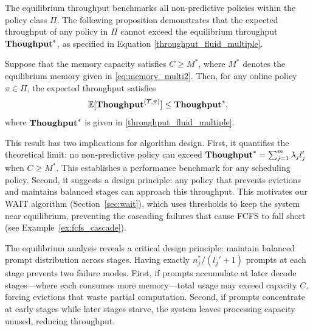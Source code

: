 The equilibrium throughput benchmarks all non-predictive policies within the policy class \(\Pi\). The following proposition demonstrates that the expected throughput of any policy in \(\Pi\) cannot exceed the equilibrium throughput \(\textbf{Thoughput}^*\), as specified in Equation \eqref{throughput_fluid_multiple}. 

\begin{proposition}\label{prop::online policy expected throughput upper bound, multiple type}
Suppose that the memory capacity satisfies \(C \geq M^*\), where \(M^*\) denotes the equilibrium memory given in \eqref{eq:memory_multi2}. Then, for any online policy \(\pi \in \Pi\), the expected throughput satisfies
\[
\mathbb{E}[\textbf{Thoughput}^{(T,\pi)}] \leq \textbf{Thoughput}^*,
\]
where \(\textbf{Thoughput}^*\) is given in \eqref{throughput_fluid_multiple}.
\end{proposition}
This result has two implications for algorithm design. First, it quantifies the theoretical limit: no non-predictive policy can exceed $\textbf{Thoughput}^* = \sum_{j=1}^m \lambda_j l_j'$ when $C \geq M^*$. This establishes a performance benchmark for any scheduling policy. Second, it suggests a design principle: any policy that prevents evictions and maintains balanced stages can approach this throughput. This motivates our WAIT algorithm (Section~\ref{sec:wait}), which uses thresholds to keep the system near equilibrium, preventing the cascading failures that cause FCFS to fall short (see Example~\ref{ex:fcfs_cascade}).

The equilibrium analysis reveals a critical design principle: maintain balanced prompt distribution across stages. Having exactly $n_j^*/(l_j'+1)$ prompts at each stage prevents two failure modes. First, if prompts accumulate at later decode stages---where each consumes more memory---total usage may exceed capacity $C$, forcing evictions that waste partial computation. Second, if prompts concentrate at early stages while later stages starve, the system leaves processing capacity unused, reducing throughput.

